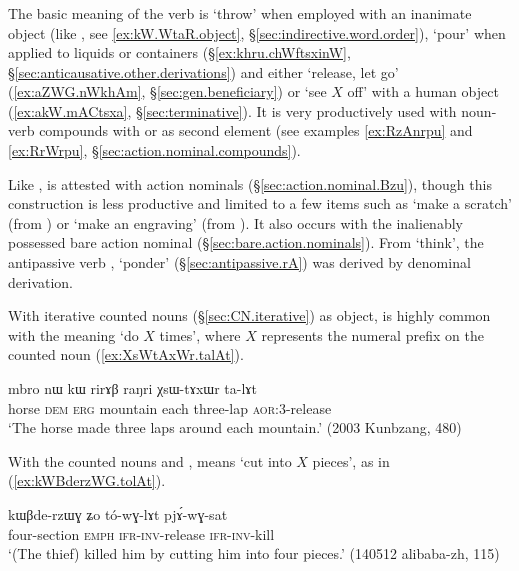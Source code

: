  \subsubsection{ } \label{sec:lAt.lv}
The basic meaning of the verb  is `throw' when employed with an inanimate object (like , see \ref{ex:kW.WtaR.object}, §\ref{sec:indirective.word.order}), `pour' when applied to liquids or containers (§\ref{ex:khru.chWftsxinW}, §\ref{sec:anticausative.other.derivations}) and either `release, let go'  (\ref{ex:aZWG.nWkhAm}, §\ref{sec:gen.beneficiary}) or `see $X$ off'
with a human object (\ref{ex:akW.mACtsxa}, §\ref{sec:terminative}). It is very productively used with noun-verb compounds with  or   as second element (see examples \ref{ex:RzAnrpu} and \ref{ex:RrWrpu}, §\ref{sec:action.nominal.compounds}).
 
Like ,   is attested with  action nominals (§\ref{sec:action.nominal.Bzu}), though this construction is less productive and limited to a few items such as  `make a scratch' (from ) or  `make an engraving'  (from ). It also occurs with the inalienably possessed bare action nominal  (§\ref{sec:bare.action.nominals}). From  `think', the antipassive verb , `ponder' (§\ref{sec:antipassive.rA}) was derived by denominal derivation.

With iterative counted nouns (§\ref{sec:CN.iterative}) as object,  is highly common with the meaning `do $X$ times', where $X$ represents the numeral prefix on the counted noun  (\ref{ex:XsWtAxWr.talAt}).

\begin{exe}
\ex \label{ex:XsWtAxWr.talAt}
\gll mbro nɯ kɯ rirɤβ raŋri χsɯ-tɤxɯr ta-lɤt \\ 
horse \textsc{dem} \textsc{erg} mountain each three-lap \textsc{aor}:3\flobv{}-release \\
\glt `The horse made three laps around each mountain.' (2003 Kunbzang, 480)
\end{exe}

With the counted nouns  and ,  means `cut into $X$ pieces', as in (\ref{ex:kWBderzWG.tolAt}).

\begin{exe}
\ex \label{ex:kWBderzWG.tolAt}
\gll  kɯβde-rzɯɣ ʑo tó-wɣ-lɤt pjɤ́-wɣ-sat \\
four-section \textsc{emph} \textsc{ifr}-\textsc{inv}-release \textsc{ifr}-\textsc{inv}-kill \\
\glt `(The thief) killed him by cutting him into four pieces.' (140512 alibaba-zh, 115)
\end{exe}

